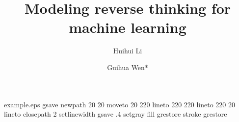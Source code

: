 %
%
%
%
%
\begin{filecontents*}{example.eps}
gsave
newpath
  20 20 moveto
  20 220 lineto
  220 220 lineto
  220 20 lineto
closepath
2 setlinewidth
gsave
  .4 setgray fill
grestore
stroke
grestore
\end{filecontents*}
%

\RequirePackage{fix-cm}
%
\documentclass[twocolumn]{svjour3}       %
%
\smartqed  %
%
\usepackage{graphicx}
\usepackage{subfigure}
\hfuzz=150pt

%
%
%
%

%


\title{Modeling reverse thinking for machine learning}


\author{Huihui Li\and Guihua Wen* %
}



